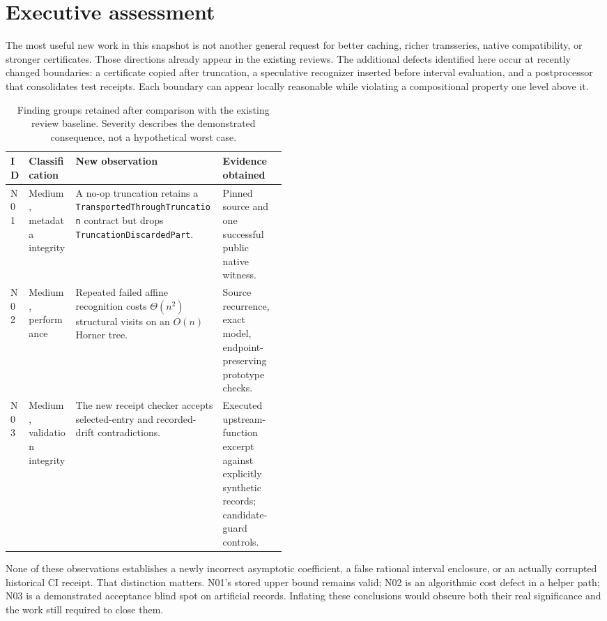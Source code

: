 \documentclass[11pt,letterpaper]{article}
\newcommand{\prop}[1]{\texttt{#1}}
\begin{document}
\begingroup
\footnotesize
\setlength{\parskip}{0pt}
\tableofcontents
\endgroup
\newpage

\section{Executive assessment}
\label{sec:executive}

The most useful new work in this snapshot is not another general request for
better caching, richer transseries, native compatibility, or stronger certificates.
Those directions already appear in the existing reviews. The additional defects
identified here occur at recently changed boundaries: a certificate copied after
truncation, a speculative recognizer inserted before interval evaluation, and a
postprocessor that consolidates test receipts. Each boundary can appear locally
reasonable while violating a compositional property one level above it.

\begin{table}[htbp]
\small
\begin{tabularx}{\linewidth}{@{}p{0.06\linewidth}p{0.17\linewidth}Yp{0.23\linewidth}@{}}
\toprule
ID & Classification & New observation & Evidence obtained \\
\midrule
N01 & Medium, metadata integrity & A no-op truncation retains a
\prop{TransportedThroughTruncation} contract but drops
\prop{TruncationDiscardedPart}. & Pinned source and one successful public native witness. \\
N02 & Medium, performance & Repeated failed affine recognition costs
$\Theta(n^2)$ structural visits on an $O(n)$ Horner tree. & Source recurrence,
exact model, endpoint-preserving prototype checks. \\
N03 & Medium, validation integrity & The new receipt checker accepts selected-entry
and recorded-drift contradictions. & Executed upstream-function excerpt against
explicitly synthetic records; candidate-guard controls. \\
\bottomrule
\end{tabularx}
\caption{Finding groups retained after comparison with the existing review baseline.
Severity describes the demonstrated consequence, not a hypothetical worst case.}
\end{table}

None of these observations establishes a newly incorrect asymptotic coefficient,
a false rational interval enclosure, or an actually corrupted historical CI
receipt. That distinction matters. N01's stored upper bound remains valid; N02
is an algorithmic cost defect in a helper path; N03 is a demonstrated acceptance
blind spot on artificial records. Inflating these conclusions would obscure both
their real significance and the work still required to close them.
\end{document}
